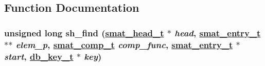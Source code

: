 \subsection{Function Documentation}
\hypertarget{group__dbprim__smat_a19}{
\subsubsection[sh\_\-find]{\setlength{\rightskip}{0pt plus 5cm}unsigned long sh\_\-find (\hyperlink{group__dbprim__smat_a1}{smat\_\-head\_\-t} $\ast$ {\em head}, \hyperlink{group__dbprim__smat_a2}{smat\_\-entry\_\-t} $\ast$$\ast$ {\em elem\_\-p}, \hyperlink{group__dbprim__smat_a5}{smat\_\-comp\_\-t} {\em comp\_\-func}, \hyperlink{group__dbprim__smat_a2}{smat\_\-entry\_\-t} $\ast$ {\em start}, \hyperlink{group__dbprim_a0}{db\_\-key\_\-t} $\ast$ {\em key})}}
\label{group__dbprim__smat_a19}


